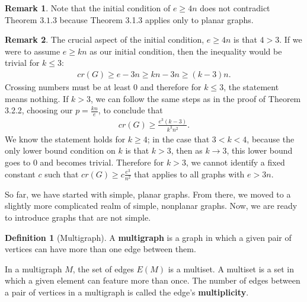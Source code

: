 \documentclass{scrippsthesisclass}
\theoremstyle{definition}
\newtheorem{defn}{Definition}[section]
\newtheorem*{remark}{Remark}
\begin{document}
\begin{remark}
    Note that the initial condition of $e \geq 4n$ does not contradict Theorem $3.1.3$ because Theorem 3.1.3 applies only to planar graphs. 
\end{remark}

\begin{remark}
    The crucial aspect of the initial condition, $e \geq 4n$ is that $4 > 3$.
    If we were to assume $e \geq kn$ as our initial condition, then the inequality would be trivial for $k \leq 3$:
    \begin{align}
        cr(G) \geq e - 3n \geq kn - 3n \geq (k - 3)n. 
    \end{align}
    Crossing numbers must be at least $0$ and therefore for $k \leq 3$, the statement means nothing. 
    If $k > 3$, we can follow the same steps as in the proof of Theorem 3.2.2, choosing our $p = \frac{kn}{e}$, to conclude that 
    \begin{align}
        cr(G) \geq \frac{e^3(k-3)}{k^3n^2}.
    \end{align}
    We know the statement holds for $k \geq 4$; in the case that $3 < k < 4$, because the only lower bound condition on $k$ is that $k > 3$, then as $k \to 3$, this lower bound goes to $0$ and becomes trivial.
    Therefore for $k > 3$, we cannot identify a fixed constant $c$ such that $cr(G) \geq c\frac{e^3}{n^2}$ that applies to all graphs with $e > 3n$.  
\end{remark}

So far, we have started with simple, planar graphs. 
From there, we moved to a slightly more complicated realm of simple, nonplanar graphs. 
Now, we are ready to introduce graphs that are not simple.

\begin{defn}[Multigraph]
    A \textbf{multigraph} is a graph in which a given pair of vertices can have more than one edge between them. 
\end{defn}

In a multigraph $M$, the set of edges $E(M)$ is a multiset. 
A multiset is a set in which a given element can feature more than once. 
The number of edges between a pair of vertices in a multigraph is called the edge's \textbf{multiplicity}. 
\end{document}
